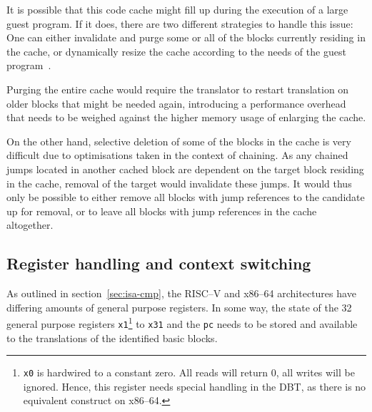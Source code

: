 It is possible that this code cache might fill up during the execution of a large guest program.
If it does, there are two different strategies to handle this issue:
One can either invalidate and purge some or all of the blocks currently residing in the cache, or dynamically resize the cache according to the needs of the guest program~\cite[S. 3]{bintrans}.

Purging the entire cache would require the translator to restart translation on older blocks that might be needed again, introducing a performance overhead that needs to be weighed against the higher memory usage of enlarging the cache.

On the other hand, selective deletion of some of the blocks in the cache is very difficult due to optimisations taken in the context of chaining.
As any chained jumps located in another cached block are dependent on the target block residing in the cache, removal of the target would invalidate these jumps.
It would thus only be possible to either remove all blocks with jump references to the candidate up for removal, or to leave all blocks with jump references in the cache altogether.

\subsection{Register handling and context switching}
\label{sec:context-switch-reg-handle}
As outlined in section~\ref{sec:isa-cmp}, the RISC--V and x86--64 architectures have differing amounts of general purpose registers.
In some way, the state of the 32 general purpose registers \texttt{x1}\footnote{\texttt{x0} is hardwired to a constant zero. All reads will return 0, all writes will be ignored. Hence, this register needs special handling in the DBT, as there is no equivalent construct on x86--64.} to \texttt{x31} and the \texttt{pc} needs to be stored and available to the translations of the identified basic blocks.
